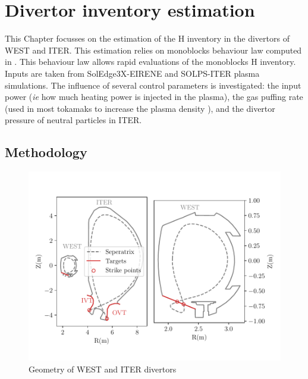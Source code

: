 \setchapterpreamble[u]{\margintoc}
\chapter{Divertor inventory estimation}\label{Chapter4}


This Chapter focusses on the estimation of the H inventory in the divertors of WEST and ITER.
This estimation relies on monoblocks behaviour law computed in .
This behaviour law allows rapid evaluations of the monoblocks H inventory.
Inputs are taken from SolEdge3X-EIRENE \cite{bufferand_three-dimensional_2019} and SOLPS-ITER \cite{kaveeva_solps-iter_2020} plasma simulations.
The influence of several control parameters is investigated: the input power (\textit{ie} how much heating power is injected in the plasma), the gas puffing rate (used in most tokamaks to increase the plasma density \cite{zweben_effect_2014}), and the divertor pressure of neutral particles in ITER.


\section{Methodology}
\begin{figure}[h!]
    \centering
    \includegraphics[width=0.95\linewidth]{Figures/divertor/coordinates.pdf}
    \caption{Geometry of WEST and ITER divertors}
    \label{fig: reactors}
\end{figure}

